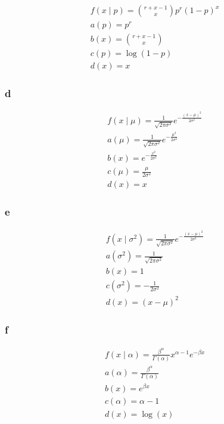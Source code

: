 \documentclass[12pt,letterpaper]{article}
\theoremstyle{definition}
\begin{document}
\begin{gather*}
  f(x \mid p) = \binom{r + x - 1}{x}p^r(1-p)^x 
  \\
  a(p) = p^r \\
  b(x) = \binom{r + x - 1}{x} \\
  c(p) = \log(1-p) \\
  d(x) = x
\end{gather*}

\subsubsection*{d}

\begin{gather*}
  f(x \mid \mu) = \frac{1}{\sqrt{2\pi\sigma^2}}e^{-\frac{(x-\mu)^2}{2\sigma^2}} \\
  a(\mu) = \frac{1}{\sqrt{2\pi\sigma^2}}e^{-\frac{\mu^2}{2\sigma^2}}\\
  b(x) = e^{-\frac{x^2}{2\sigma^2}} \\
  c(\mu) = \frac{\mu}{2\sigma^2} \\
  d(x) = x
\end{gather*}

\subsubsection*{e}

\begin{gather*}
  f(x \mid \sigma^2) = \frac{1}{\sqrt{2\pi\sigma^2}}e^{-\frac{(x-\mu)^2}{2\sigma^2}} \\
  a(\sigma^2) = \frac{1}{\sqrt{2\pi\sigma^2}}\\
  b(x) = 1 \\
  c(\sigma^2) = -\frac{1}{2\sigma^2} \\
  d(x) = (x-\mu)^2
\end{gather*}

\subsubsection*{f}

\begin{gather*}
  f(x \mid \alpha) = \frac{\beta^\alpha}{\Gamma(\alpha)}x^{\alpha -1}e^{-\beta x}
  \\
  a(\alpha) =  \frac{\beta^\alpha}{\Gamma(\alpha)} \\
  b(x) = e^{\beta x} \\
  c(\alpha) = \alpha - 1\\
  d(x) = \log(x)
\end{gather*}
\end{document}
